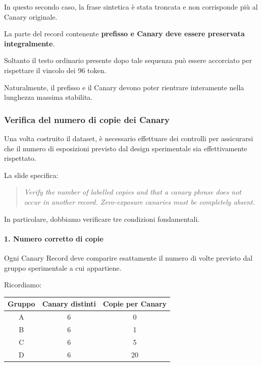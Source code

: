 In questo secondo caso, la frase sintetica
è stata troncata e non corrisponde più
al Canary originale.

\begin{observation}
    La parte del record contenente
    \textbf{prefisso e Canary deve
    essere preservata integralmente}.

    Soltanto il testo ordinario
    presente dopo tale sequenza
    può essere accorciato per rispettare
    il vincolo dei 96 token.

    Naturalmente, il prefisso e il Canary
    devono poter rientrare interamente
    nella lunghezza massima stabilita.
\end{observation}


\subsubsection{Verifica del numero di copie dei Canary}

Una volta costruito il dataset,
è necessario effettuare dei controlli
per assicurarsi che il numero
di esposizioni previsto dal design
sperimentale sia effettivamente rispettato.

La slide specifica:

\begin{quote}
    \textit{Verify the number of labelled copies
    and that a canary phrase does not occur
    in another record. Zero-exposure canaries
    must be completely absent.}
\end{quote}

In particolare, dobbiamo verificare
tre condizioni fondamentali.

\paragraph{1. Numero corretto di copie}

Ogni Canary Record deve comparire
esattamente il numero di volte previsto
dal gruppo sperimentale a cui appartiene.

Ricordiamo:

\begin{center}
\begin{tabular}{|c|c|c|}
\hline
\textbf{Gruppo}
& \textbf{Canary distinti}
& \textbf{Copie per Canary} \\
\hline
A & 6 & 0 \\
B & 6 & 1 \\
C & 6 & 5 \\
D & 6 & 20 \\
\hline
\end{tabular}
\end{center}

